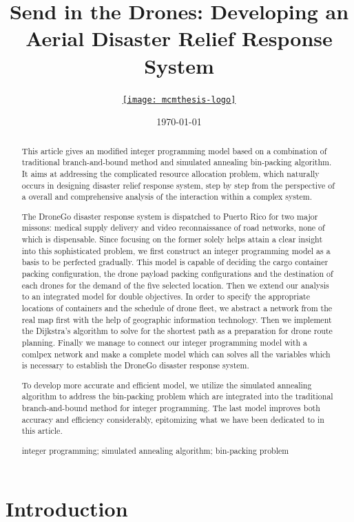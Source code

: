 \documentclass{mcmthesis}
\title{Send in the Drones: Developing an Aerial Disaster Relief Response System}
\author{\small \href{http://www.latexstudio.net/}
  {\texttt{[image: mcmthesis-logo]}}}
\date{\today}
\begin{document}
\begin{abstract}
This article gives an modified integer programming model based on a combination of traditional branch-and-bound method and simulated annealing bin-packing algorithm. It aims at addressing the complicated resource allocation problem, which naturally occurs in designing disaster relief response system, step by step from the perspective of a overall and comprehensive analysis of the interaction within a complex system. 

The DroneGo disaster response system is dispatched to Puerto Rico for two major missons: medical supply delivery and video reconnaissance of road networks, none of which is dispensable. Since focusing on the former solely helps attain a clear insight into this sophisticated problem, we first construct an integer programming model as a basis to be perfected gradually. This model is capable of deciding the cargo container packing configuration, the drone payload packing configurations and the destination of each drones for the demand of the five selected location. Then we extend our analysis to an integrated model for double objectives. In order to specify the appropriate locations of containers and the schedule of drone fleet, we abstract a network from the real map first with the help of geographic information technology. Then we implement the Dijkstra's algorithm to solve for the shortest path as a preparation for drone route planning. Finally we manage to connect our integer programming model with a comlpex network and make a complete model which can solves all the variables which is necessary to establish the DroneGo disaster response system. 

To develop more accurate and efficient model, we utilize the simulated annealing algorithm to address the bin-packing problem which are integrated into the traditional branch-and-bound method for integer programming. The last model improves both accuracy and efficiency considerably, epitomizing what we have been dedicated to in this article.
\begin{keywords}
integer programming; simulated annealing algorithm; bin-packing problem
\end{keywords}
\end{abstract}
\maketitle
\tableofcontents
\newpage

\section{Introduction}
\end{document}
